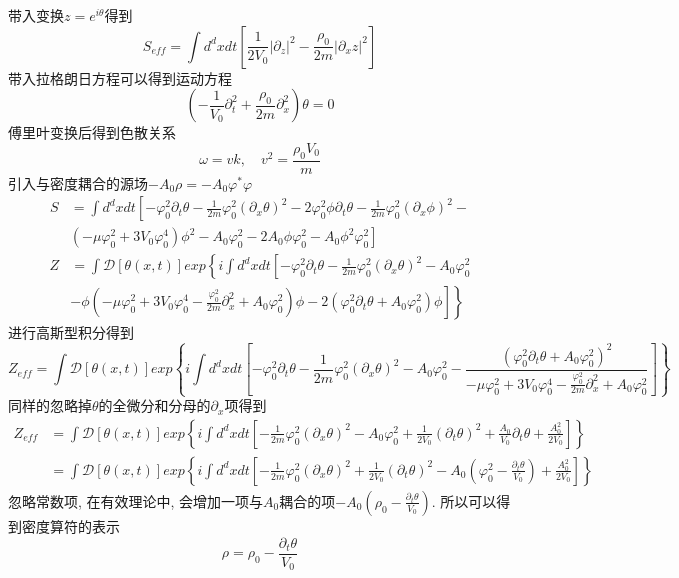 \documentclass[a4paper,11pt]{article}
\begin{document}
带入变换$z=e^{i\theta}$得到
\begin{equation*}
  S_{eff}=\int d^dxdt\left[\frac{1}{2V_0}|\partial_z|^2-\frac{\rho_0}{2m}|\partial_xz|^2\right]
\end{equation*}
带入拉格朗日方程可以得到运动方程
\begin{equation*}
  (-\frac{1}{V_0}\partial_t^2+\frac{\rho_0}{2m}\partial_x^2)\theta=0
\end{equation*}
傅里叶变换后得到色散关系
\begin{equation*}
  \omega=vk,\quad v^2=\frac{\rho_0V_0}{m}
\end{equation*}
引入与密度耦合的源场$-A_0\rho=-A_0\varphi^*\varphi$
\begin{equation*}
  \begin{split}
     S&=\int d^dxdt\left[-\varphi_0^2\partial_t\theta-\frac{1}{2m}\varphi_0^2(\partial_x\theta)^2-2\varphi_0^2\phi\partial_t\theta-\frac{1}{2m}\varphi_0^2(\partial_x\phi)^2-\right.\\
  &\left.(-\mu\varphi_0^2+3V_0\varphi_0^4)\phi^2-A_0\varphi_0^2-2A_0\phi\varphi_0^2-A_0\phi^2\varphi_0^2\right]
  \end{split}
\end{equation*}
\begin{equation*}
  \begin{split}
     Z&=\int\mathcal{D}[\theta(x,t)]exp\left\{i\int d^dxdt\left[-\varphi_0^2\partial_t\theta-\frac{1}{2m}\varphi_0^2(\partial_x\theta)^2-A_0\varphi_0^2\right.\right.\\
  &\left.\left.-\phi(-\mu\varphi_0^2+3V_0\varphi_0^4-\frac{\varphi_0^2}{2m}\partial_x^2+A_0\varphi_0^2)\phi-2(\varphi_0^2\partial_t\theta+A_0\varphi_0^2)\phi\right]\right\}
  \end{split}
\end{equation*}
进行高斯型积分得到
\begin{equation*}
  Z_{eff}=\int\mathcal{D}[\theta(x,t)]exp\left\{i\int d^dxdt\left[-\varphi_0^2\partial_t\theta-\frac{1}{2m}\varphi_0^2(\partial_x\theta)^2-A_0\varphi_0^2-\frac{(\varphi_0^2\partial_t\theta+A_0\varphi_0^2)^2}{-\mu\varphi_0^2+3V_0\varphi_0^4-\frac{\varphi_0^2}{2m}\partial_x^2+A_0\varphi_0^2}\right]\right\}
\end{equation*}
同样的忽略掉$\theta$的全微分和分母的$\partial_x$项得到
\begin{equation*}
  \begin{split}
     Z_{eff}&=\int\mathcal{D}[\theta(x,t)]exp\left\{i\int d^dxdt\left[-\frac{1}{2m}\varphi_0^2(\partial_x\theta)^2-A_0\varphi_0^2+\frac{1}{2V_0}(\partial_t\theta)^2+\frac{A_0}{V_0}\partial_t\theta+\frac{A_0^2}{2V_0}\right]\right\}\\
       &=\int\mathcal{D}[\theta(x,t)]exp\left\{i\int d^dxdt\left[-\frac{1}{2m}\varphi_0^2(\partial_x\theta)^2+\frac{1}{2V_0}(\partial_t\theta)^2-A_0(\varphi_0^2-\frac{\partial_t\theta}{V_0})+\frac{A_0^2}{2V_0}\right]\right\}
  \end{split}
\end{equation*}
忽略常数项, 在有效理论中, 会增加一项与$A_0$耦合的项$-A_0(\rho_0-\frac{\partial_t\theta}{V_0})$. 所以可以得到密度算符的表示
\begin{equation*}
  \rho=\rho_0-\frac{\partial_t\theta}{V_0}
\end{equation*}
\end{document}
